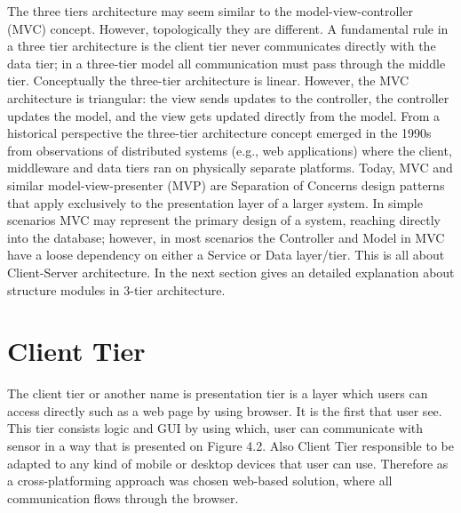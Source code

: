 \newline
The three tiers architecture may seem similar to the model-view-controller (MVC) concept. However, topologically they are different. A fundamental rule in a three tier architecture is the client tier never communicates directly with the data tier; in a three-tier model all communication must pass through the middle tier. Conceptually the three-tier architecture is linear. However, the MVC architecture is triangular: the view sends updates to the controller, the controller updates the model, and the view gets updated directly from the model.
From a historical perspective the three-tier architecture concept emerged in the 1990s from observations of distributed systems (e.g., web applications) where the client, middleware and data tiers ran on physically separate platforms. Today, MVC and similar model-view-presenter (MVP) are Separation of Concerns design patterns that apply exclusively to the presentation layer of a larger system. In simple scenarios MVC may represent the primary design of a system, reaching directly into the database; however, in most scenarios the Controller and Model in MVC have a loose dependency on either a Service or Data layer/tier. This is all about Client-Server architecture.
\newline
In the next section gives an detailed explanation about structure modules in 3-tier architecture.

\section{Client Tier}
  The client tier or another name is presentation tier is a layer which users can access directly such as a web page by using browser. It is the first that user see. This tier consists logic and GUI by using which, user can communicate with sensor in a way that is presented on Figure 4.2. Also Client Tier responsible to be adapted to any kind of mobile or desktop devices that user can use. Therefore as a cross-platforming approach was chosen web-based solution, where all communication flows through the browser.


